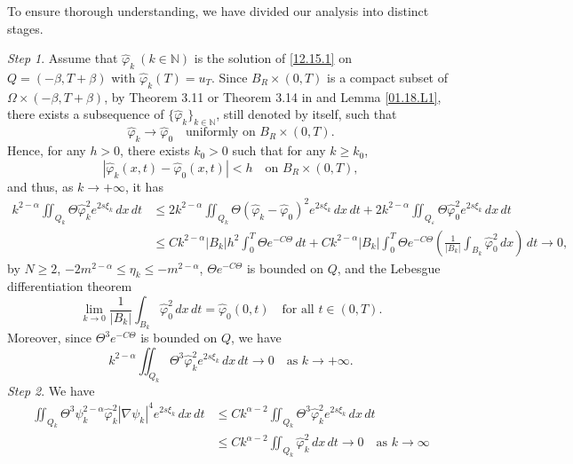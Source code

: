 \documentclass[11pt]{article}
\numberwithin{equation}{section}
\begin{document}
  To ensure thorough understanding, we have divided our analysis into distinct stages.

{\it Step 1}. Assume that $\widehat{\varphi}_k\ (k \in \mathbb{N})$ is the solution of \eqref{12.15.1} on $Q = (-\beta,T+\beta)$ with $\widehat{\varphi}_k(T) = u_T$. Since $B_R \times (0,T)$ is a compact subset of $\Omega \times (-\beta,T+\beta)$, by Theorem 3.11 or Theorem 3.14 in \cite{FF} and Lemma \ref{01.18.L1}, there exists a subsequence of $\{\widehat{\varphi}_k\}_{k \in \mathbb{N}}$, still denoted by itself, such that
\begin{equation*}
\widehat{\varphi}_k \to \widehat{\varphi}_0 \quad \text{uniformly on } B_R \times (0,T).
\end{equation*}
Hence, for any $h > 0$, there exists $k_0 > 0$ such that for any $k \geq k_0$,
\begin{equation*}
|\widehat{\varphi}_k(x,t) - \widehat{\varphi}_0(x,t)| < h \quad \text{on } B_R \times (0,T),
\end{equation*}
and thus, as $k \to +\infty$, it has
\begin{equation*}
\begin{split}
k^{2-\alpha}\iint_{Q_k}\Theta  \widehat{\varphi}_k^2e^{2s\xi_k} \, dx \, dt
&\leq 2k^{2-\alpha}\iint_{Q_k}\Theta  (\widehat{\varphi}_k - \widehat{\varphi}_0)^2e^{2s\xi_k} \, dx \, dt + 2k^{2-\alpha}\iint_{Q_\varepsilon}\Theta \widehat{\varphi}_0^2e^{2s\xi_k} \, dx \, dt\\
&\leq Ck^{2-\alpha}|B_k|h^2\int_0^T\Theta e^{-C\Theta} \, dt + Ck^{2-\alpha}|B_k|\int_0^T\Theta e^{-C\Theta}\left(\frac{1}{|B_k|}\int_{B_k} \widehat{\varphi}_0^2 \, dx\right) \, dt \to 0,
\end{split}
\end{equation*}
by $N \geq 2$, $-2m^{2-\alpha} \leq \eta_k \leq -m^{2-\alpha}$, $\Theta e^{-C\Theta}$ is bounded on $Q$, and the Lebesgue differentiation theorem
\begin{equation*}
\lim_{k \to 0}\frac{1}{|B_k|}\int_{B_k}\widehat{\varphi}_0^2 \, dx \, dt = \widehat{\varphi}_0(0,t) \quad \text{for all } t \in (0,T).
\end{equation*}
Moreover, since $\Theta^3e^{-C\Theta}$ is bounded on $Q$, we have
\begin{equation*}
k^{2-\alpha}\iint_{Q_k}\Theta^3\widehat{\varphi}_k^2 e^{2s\xi_k} \, dx \, dt \to 0 \quad \text{as } k \to +\infty.
\end{equation*}
{\it Step 2}. We have
\begin{equation*}
\begin{split}
\iint_{Q_k} \Theta^3\psi_k^{2-\alpha}\widehat{\varphi}_k^2|\nabla \psi_k|^4e^{2s\xi_k} \, dx \, dt
&\leq Ck^{\alpha-2}\iint_{Q_k} \Theta^3 \widehat{\varphi}_k^2e^{2s\xi_k} \, dx \, dt\\
&\leq Ck^{\alpha-2}\iint_{Q_k}  \widehat{\varphi}_k^2 \, dx \, dt \to 0 \quad \text{as } k \to \infty
\end{split}
\end{equation*}
\end{document}
